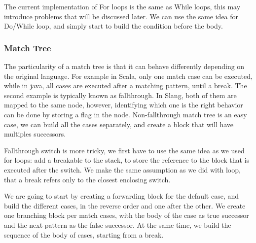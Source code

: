 The current implementation of For loops is the same as While loops, this may introduce problems that will be discussed later. We can use the same idea for Do/While loop, and simply start to build the condition before the body.

\subsubsection{Match Tree}
\label{subsubsec:match_tree_cfg}

The particularity of a match tree is that it can behave differently depending on the original language. 
For example in Scala, only one match case can be executed, while in java, all cases are executed after a matching pattern, until a break. 
The second example is typically known as fallthrough. 
In Slang, both of them are mapped to the same node, however, identifying which one is the right behavior can be done by storing a flag in the node. 
Non-fallthrough match tree is an easy case, we can build all the cases separately, and create a block that will have multiples successors.

Fallthrough switch is more tricky, we first have to use the same idea as we used for loops: add a breakable to the stack, to store the reference to the block that is executed after the switch. 
We make the same assumption as we did with loop, that a break refers only to the closest enclosing switch. 

We are going to start by creating a forwarding block for the default case, and build the different cases, in the reverse order and one after the other. 
We create one branching block per match cases, with the body of the case as true successor and the next pattern as the false successor. 
At the same time, we build the sequence of the body of cases, starting from a break.



